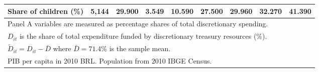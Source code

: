 \begin{table}[htbp]
{\begin{tabular}{lrrrrrrrr}
\quad Share of children (\%) & 5,144 & 29.900 & 3.549 & 10.590 & 27.500 & 29.960 & 32.270 & 41.390 \\
\hline\hline
\multicolumn{9}{l}{\footnotesize Panel A variables are measured as percentage shares of total discretionary spending.} \\
\multicolumn{9}{l}{\footnotesize $D_{it}$ is the share of total expenditure funded by discretionary treasury resources (\%).} \\
\multicolumn{9}{l}{\footnotesize $\tilde{D}_{it} = D_{it} - \bar{D}$ where $\bar{D} = 71.4\%$ is the sample mean.} \\
\multicolumn{9}{l}{\footnotesize PIB per capita in 2010 BRL. Population from 2010 IBGE Census.} \\
\end{tabular}%
}
\end{table}
